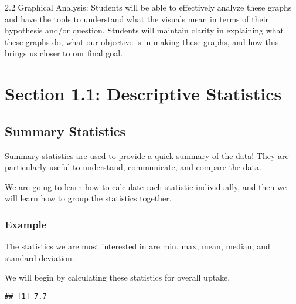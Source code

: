 \documentclass[
]{article}
\newenvironment{Shaded}{\begin{snugshade}}{\end{snugshade}}
\newcommand{\AttributeTok}[1]{\textcolor[rgb]{0.13,0.29,0.53}{#1}}
\newcommand{\ConstantTok}[1]{\textcolor[rgb]{0.56,0.35,0.01}{#1}}
\newcommand{\FunctionTok}[1]{\textcolor[rgb]{0.13,0.29,0.53}{\textbf{#1}}}
\newcommand{\NormalTok}[1]{#1}
\newcommand{\SpecialCharTok}[1]{\textcolor[rgb]{0.81,0.36,0.00}{\textbf{#1}}}
\newcommand{\StringTok}[1]{\textcolor[rgb]{0.31,0.60,0.02}{#1}}
\begin{document}
2.2 Graphical Analysis: Students will be able to effectively analyze
these graphs and have the tools to understand what the visuals mean in
terms of their hypothesis and/or question. Students will maintain
clarity in explaining what these graphs do, what our objective is in
making these graphs, and how this brings us closer to our final goal.

\section{Section 1.1: Descriptive
Statistics}\label{section-1.1-descriptive-statistics}

\subsection{Summary Statistics}\label{summary-statistics}

Summary statistics are used to provide a quick summary of the data! They
are particularly useful to understand, communicate, and compare the
data.

We are going to learn how to calculate each statistic individually, and
then we will learn how to group the statistics together.

\subsubsection{Example}\label{example}

The statistics we are most interested in are min, max, mean, median, and
standard deviation.

We will begin by calculating these statistics for overall uptake.

\begin{Shaded}
\end{Shaded}

\begin{verbatim}
## [1] 7.7
\end{verbatim}

\begin{Shaded}
\end{Shaded}
\end{document}
